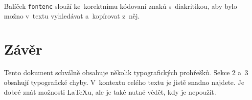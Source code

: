 \documentclass[twocolumn, 10pt, a4paper]{article}
\begin{document}
Balíček \texttt{fontenc} slouží ke~korektnímu kódovaní znaků s~diakritikou, aby bylo možno v~textu vyhledávat a~kopírovat z~něj.


\section{Závěr}

Tento dokument schválně obsahuje několik typografických prohřešků.
Sekce 2 a~3 obsahují typografické chyby.
V~kontextu celého textu je jistě snadno najdete.
Je dobré znát možnosti \LaTeX u, ale je také nutné vědět, kdy je nepoužít.
\end{document}

